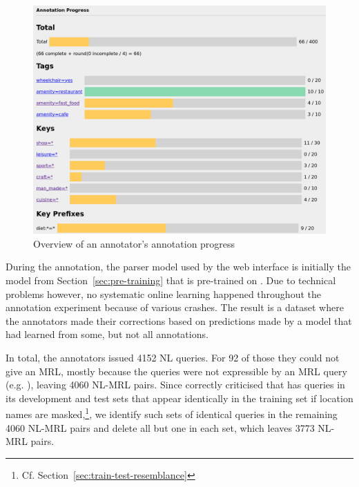 \begin{figure}[h]
  \centering
  \includegraphics[width=\textwidth]{fig/annotation_progress.png}
  \caption[Annotation progress overview]{Overview of an annotator’s annotation
    progress}
  \label{fig:annotation-progress}
\end{figure}

During the annotation, the parser model used by the web interface is initially
the model from Section~\ref{sec:pre-training} that is pre-trained on
\nlmapsthree{}. Due to technical problems however, no systematic online learning
happened throughout the annotation experiment because of various crashes. The
result is a dataset where the annotators made their corrections based on
predictions made by a model that had learned from some, but not all annotations.

In total, the annotators issued \num{4152} NL queries. For \num{92} of those
they could not give an MRL, mostly because the queries were not expressible by
an MRL query (e.g. ), leaving \num{4060}
NL-MRL pairs. Since \textcite{staniek-2020} correctly criticised that
\nlmapstwo{} has queries in its development and test sets that appear
identically in the training set if location names are masked,\footnote{Cf.
  Section~\ref{sec:train-test-resemblance}}, we identify such sets of identical
queries in the remaining \num{4060} NL-MRL pairs and delete all but one in each
set, which leaves \num{3773} NL-MRL pairs.

